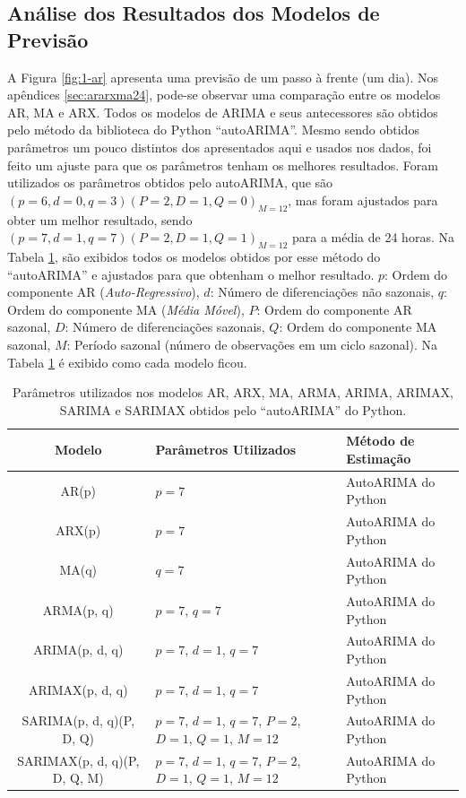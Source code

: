 \subsection{An\'alise dos Resultados dos Modelos de Previs\~ao}

A Figura \ref{fig:1-ar} apresenta uma previsão de um passo à frente (um dia). Nos apêndices \ref{sec:ararxma24}, pode-se observar uma comparação entre os modelos AR, MA e ARX.
Todos os modelos de ARIMA e seus antecessores são obtidos pelo método da biblioteca do Python ``autoARIMA''. Mesmo sendo obtidos parâmetros um pouco distintos dos apresentados aqui e usados nos dados, foi feito um ajuste para que os parâmetros tenham os melhores resultados. Foram utilizados os parâmetros obtidos pelo autoARIMA, que são $(p = 6, d = 0, q = 3) (P = 2, D = 1, Q = 0)_{M = 12}$, mas foram ajustados para obter um melhor resultado, sendo $(p = 7, d = 1, q = 7) (P = 2, D = 1, Q = 1)_{M = 12}$ para a média de 24 horas. Na Tabela \ref{tab:autoarima_params}, são exibidos todos os modelos obtidos por esse método do ``autoARIMA'' e ajustados para que obtenham o melhor resultado.
\(p\): Ordem do componente AR (\textit{Auto-Regressivo}),
\(d\): Número de diferenciações não sazonais,
\(q\): Ordem do componente MA (\textit{Média Móvel}),
\(P\): Ordem do componente AR sazonal,
\(D\): Número de diferenciações sazonais,
\(Q\): Ordem do componente MA sazonal,
\(M\): Período sazonal (número de observações em um ciclo sazonal).
Na Tabela \ref{tab:autoarima_params} é exibido como cada modelo ficou.


\begin{table}[tb]
	\centering
	\caption{Parâmetros utilizados nos modelos AR, ARX, MA, ARMA, ARIMA, ARIMAX, SARIMA e SARIMAX obtidos pelo ``autoARIMA'' do Python.}
	\label{tab:autoarima_params}
	\small
	\begin{tabular}{cp{9cm}p{2cm}}
		\hline
		\textbf{Modelo} & \textbf{Parâmetros Utilizados} & \textbf{Método de Estimação} \\
		\hline
		AR(p) & \( p = 7 \) & AutoARIMA do Python \\
		ARX(p) & \( p = 7 \) & AutoARIMA do Python \\
		MA(q) & \( q = 7 \) & AutoARIMA do Python \\
		ARMA(p, q) & \( p = 7 \), \( q = 7 \) & AutoARIMA do Python \\
		ARIMA(p, d, q) & \( p = 7 \), \( d = 1 \), \( q = 7 \) & AutoARIMA do Python \\
		ARIMAX(p, d, q) & \( p = 7 \), \( d = 1 \), \( q = 7 \) & AutoARIMA do Python \\
		SARIMA(p, d, q)(P, D, Q) & \( p = 7 \), \( d = 1 \), \( q = 7 \), \( P = 2 \), \( D = 1 \), \( Q = 1 \), \( M = 12 \) & AutoARIMA do Python \\
		SARIMAX(p, d, q)(P, D, Q, M) & \( p = 7 \), \( d = 1 \), \( q = 7 \), \( P = 2 \), \( D = 1 \), \( Q = 1 \), \( M = 12 \) & AutoARIMA do Python \\
		\hline
	\end{tabular}
	
\end{table}


